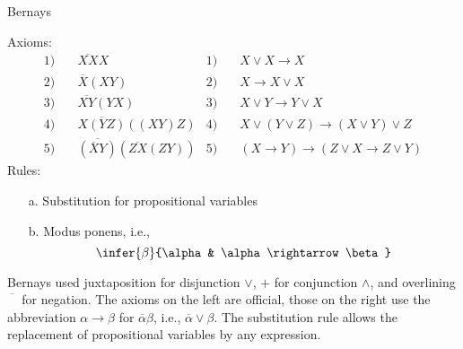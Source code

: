 \calculusAcronym{}



\maketitle

\begin{entry}{Bernays}  

\begin{calculus}
Axioms:
\begin{align*}
1) \quad & \overline{XX}X &
1) \quad & X \lor X \rightarrow X\\
2) \quad & \overline{X}(XY) &
2) \quad & X \rightarrow X \lor X\\
3) \quad & \overline{XY}(YX) &
3) \quad & X \lor Y \rightarrow Y \lor X \\
4) \quad & \overline{X(YZ)}((XY)Z) &
4) \quad & X \lor (Y \lor Z) \rightarrow (X \lor Y) \lor Z \\
5) \quad & \overline{(\overline{X}Y)}(\overline{ZX}(ZY)) &
5) \quad & (X \rightarrow Y) \rightarrow (Z \lor X \rightarrow Z \lor Y) 
\end{align*}
Rules:
\begin{enumerate}
\item[a.] Substitution for propositional variables
\item[b.] Modus ponens, i.e.,
\[
\infer{\beta}{\alpha & \alpha \rightarrow \beta}
\]
\end{enumerate}

\end{calculus}

\begin{clarifications}
  Bernays used juxtaposition for disjunction $\lor$, $+$ for conjunction $\land$,
  and overlining $\overline{\phantom{X}}$ for negation. The axioms on the left are
  official, those on the right use the abbreviation $\alpha \rightarrow \beta$ for
  $\overline{\alpha}\beta$, i.e., $\overline{\alpha} \lor \beta$. The substitution
  rule allows the replacement of propositional variables by any expression.
\end{clarifications}


\end{entry}
